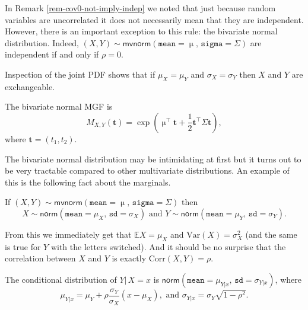 \documentclass[captions=tableheading]{scrbook}
\begin{document}
\begin{rem}
In Remark \ref{rem-cov0-not-imply-indep} we noted that just because random variables are uncorrelated it does not necessarily mean that they are independent. However, there is an important exception to this rule: the bivariate normal distribution. Indeed, \((X,Y)\sim\mathsf{mvnorm}(\mathtt{mean}=\upmu,\,\mathtt{sigma}=\Sigma)\) are independent if and only if \(\rho=0\). 
\end{rem}

\begin{rem}
Inspection of the joint PDF shows that if \(\mu_{X}=\mu_{Y}\) and \(\sigma_{X}=\sigma_{Y}\) then \(X\) and \(Y\) are exchangeable.
\end{rem}

The bivariate normal MGF is
\begin{equation}
M_{X,Y}(\mathbf{t})=\exp\left(\upmu^{\top}\mathbf{t}+\frac{1}{2}\mathbf{t}^{\top}\Sigma\mathbf{t}\right),
\end{equation}
where \(\mathbf{t}=(t_{1},t_{2})\).

The bivariate normal distribution may be intimidating at first but it turns out to be very tractable compared to other multivariate distributions. An example of this is the following fact about the marginals. 

\begin{fact}
If \((X,Y)\sim\mathsf{mvnorm}(\mathtt{mean}=\upmu,\,\mathtt{sigma}=\Sigma)\) then
\begin{equation}
X\sim\mathsf{norm}(\mathtt{mean}=\mu_{X},\,\mathtt{sd}=\sigma_{X})\mbox{ and }Y\sim\mathsf{norm}(\mathtt{mean}=\mu_{Y},\,\mathtt{sd}=\sigma_{Y}).
\end{equation}
\end{fact}

From this we immediately get that \(\mathbb{E} X=\mu_{X}\) and \(\mbox{Var}(X)=\sigma_{X}^{2}\) (and the same is true for \(Y\) with the letters switched). And it should be no surprise that the correlation between \(X\) and \(Y\) is exactly \(\mbox{Corr}(X,Y)=\rho\).

\begin{prop}
The conditional distribution of \(Y|\, X=x\) is \(\mathsf{norm}(\mathtt{mean}=\mu_{Y|x},\,\mathtt{sd}=\sigma_{Y|x})\), where
\begin{equation}
\mu_{Y|x}=\mu_{Y}+\rho\frac{\sigma_{Y}}{\sigma_{X}}\left(x-\mu_{X}\right),\mbox{ and }\sigma_{Y|x}=\sigma_{Y}\sqrt{1-\rho^{2}}.
\end{equation}
\end{prop}
\end{document}
